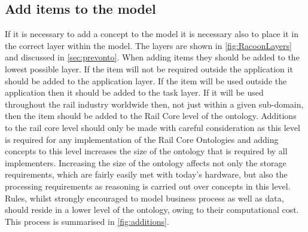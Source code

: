 \subsection{Add items to the model }
If it is necessary to add a concept to the model it is necessary also to place it in the correct layer within the model. The layers are shown in \autoref{fig:RacoonLayers} and discussed in \autoref{sec:prevonto}. When adding items they should be added to the lowest possible layer. If the item will not be required outside the application it should be added to the application layer. If the item will be used outside the application then it should be added to the task layer. If it will be used throughout the rail industry worldwide then, not just within a given sub-domain, then the item should be added to the Rail Core level of the ontology. Additions to the rail core level should only be made with careful consideration as this level is required for any implementation of the Rail Core Ontologies and adding concepts to this level increases the size of the ontology that is required by all implementers. Increasing the size of the ontology affects not only the storage requirements, which are fairly easily met with today's hardware, but also the processing requirements as reasoning is carried out over concepts in this level. Rules, whilst strongly encouraged to model business process as well as data, should reside in a lower level of the ontology, owing to their computational cost. This process is summarised in \autoref{fig:additions}.

